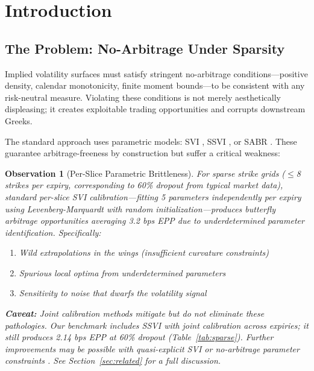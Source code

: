 \documentclass[11pt,a4paper]{article}
\newtheorem{observation}{Observation}
\begin{document}
\section{Introduction}
\label{sec:introduction}

\subsection{The Problem: No-Arbitrage Under Sparsity}

Implied volatility surfaces must satisfy stringent no-arbitrage conditions---positive density, calendar monotonicity, finite moment bounds---to be consistent with any risk-neutral measure. Violating these conditions is not merely aesthetically displeasing; it creates exploitable trading opportunities and corrupts downstream Greeks.

The standard approach uses parametric models: SVI \citep{gatheral2004}, SSVI \citep{gatheral2014}, or SABR \citep{hagan2002}. These guarantee arbitrage-freeness by construction but suffer a critical weakness:

\begin{observation}[Per-Slice Parametric Brittleness]
For sparse strike grids ($\leq$8 strikes per expiry, corresponding to 60\% dropout from typical market data), standard \textit{per-slice} SVI calibration---fitting 5 parameters independently per expiry using Levenberg-Marquardt with random initialization---produces butterfly arbitrage opportunities averaging 3.2 bps EPP due to underdetermined parameter identification. Specifically:
\begin{enumerate}[label=(\alph*)]
    \item Wild extrapolations in the wings (insufficient curvature constraints)
    \item Spurious local optima from underdetermined parameters
    \item Sensitivity to noise that dwarfs the volatility signal
\end{enumerate}
\textbf{Caveat:} Joint calibration methods mitigate but do not eliminate these pathologies. Our benchmark includes SSVI \citep{gatheral2014} with joint calibration across expiries; it still produces 2.14 bps EPP at 60\% dropout (Table~\ref{tab:sparse}). Further improvements may be possible with quasi-explicit SVI \citep{demarco2009} or no-arbitrage parameter constraints \citep{martini2022}. See Section~\ref{sec:related} for a full discussion.
\end{observation}
\end{document}
